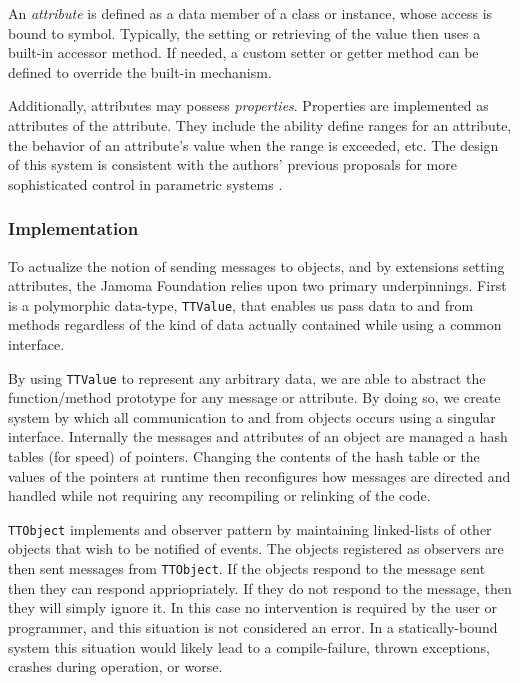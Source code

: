 \documentclass[twoside,10pt]{article}
\begin{document}
An \emph{attribute} is defined as a data member of a class or instance, whose access is bound to symbol.  Typically, the setting or retrieving of the value then uses a built-in accessor method.  If needed, a custom setter or getter method can be defined to override the built-in mechanism.

Additionally, attributes may possess \emph{properties}.  Properties are implemented as attributes of the attribute.  They include the ability define ranges for an attribute, the behavior of an attribute's value when the range is exceeded, etc.  The design of this system is consistent with the authors' previous proposals for more sophisticated control in parametric systems \cite{Place:2008params}.

\subsubsection{Implementation}

To actualize the notion of sending messages to objects, and by extensions setting attributes, the Jamoma Foundation relies upon two primary underpinnings.  First is a polymorphic data-type, \texttt{\small{TTValue}}, that enables us pass data to and from methods regardless of the kind of data actually contained while using a common interface.  %

By using \texttt{\small{TTValue}} to represent any arbitrary data, we are able to abstract the function/method prototype for any message or attribute.  By doing so, we create system by which all communication to and from objects occurs using a singular interface.  Internally the messages and attributes of an object are managed a hash tables (for speed) of pointers.  Changing the contents of the hash table or the values of the pointers at runtime then reconfigures how messages are directed and handled while not requiring any recompiling or relinking of the code.

\texttt{\small{TTObject}} implements and observer pattern by maintaining linked-lists of other objects that wish to be notified of events.  The objects registered as observers are then sent messages from \texttt{\small{TTObject}}.  If the objects respond to the message sent then they can respond appriopriately.  If they do not respond to the message, then they will simply ignore it.  In this case no intervention is required by the user or programmer, and this situation is not considered an error.  In a statically-bound system this situation would likely lead to a compile-failure, thrown exceptions, crashes during operation, or worse.
\end{document}
